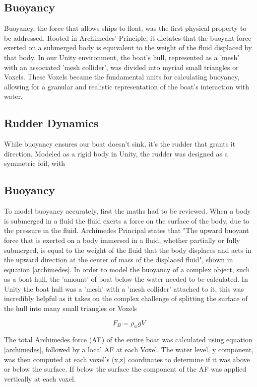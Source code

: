 \subsection{Buoyancy}
Buoyancy, the force that allows ships to float, was the first physical property to be addressed. Rooted in Archimedes' Principle, it dictates that the buoyant force exerted on a submerged body is equivalent to the weight of the fluid displaced by that body. In our Unity environment, the boat's hull, represented as a 'mesh' with an associated 'mesh collider', was divided into myriad small triangles or Voxels. These Voxels became the fundamental units for calculating buoyancy, allowing for a granular and realistic representation of the boat's interaction with water.

\subsection{Rudder Dynamics}
While buoyancy ensures our boat doesn't sink, it's the rudder that grants it direction. Modeled as a rigid body in Unity, the rudder was designed as a symmetric foil, with
\subsection{Buoyancy}
To model buoyancy accurately, first the maths had to be reviewed. When a body is submerged in a fluid the fluid exerts a force on the surface of the body, due to the pressure in the fluid. Archimedes Principal states that "The upward buoyant force that is exerted on a body immersed in a fluid, whether partially or fully submerged, is equal to the weight of the fluid that the body displaces and acts in the upward direction at the center of mass of the displaced fluid", shown in equation \ref{archimedes}. In order to model the buoyancy of a complex object, such as a boat hull, the 'amount' of boat below the water needed to be calculated. In Unity the boat hull was a 'mesh' with a 'mesh collider' attached to it, this was incredibly helpful as it takes on the complex challenge of splitting the surface of the hull into many small triangles or Voxels 


\begin{equation}
    F_B = \rho_{w}gV
    \label{archimedes}
\end{equation}

The total Archimedes force (AF) of the entire boat was calculated using equation \ref{archimedes}, followed by a local AF at each Voxel. The water level, y component, was then computed at each voxel's (x,z) coordinates to determine if it was above or below the surface. If below the surface the component of the AF was applied vertically at each voxel. 

